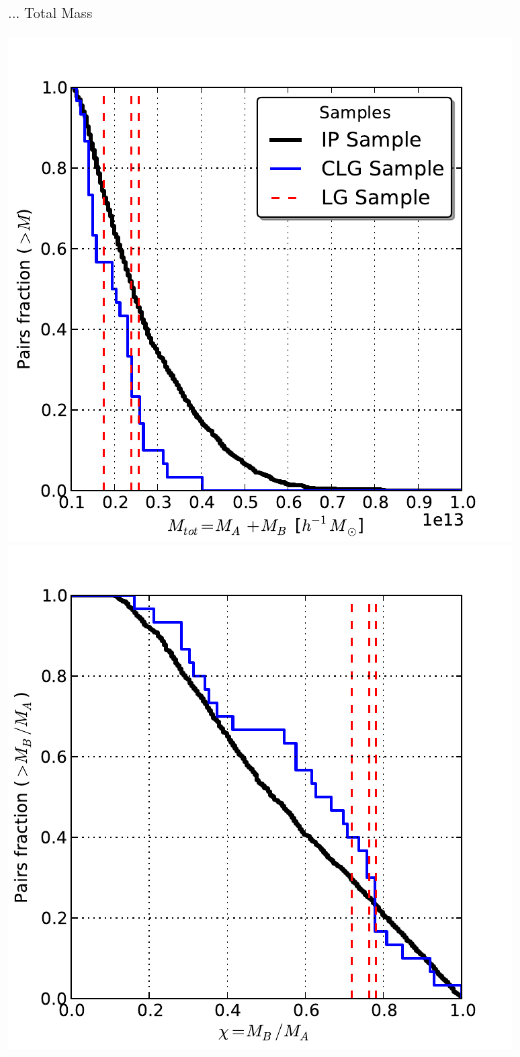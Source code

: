 \documentclass[usenatbib]{latex/mn2e}
\begin{document}
... Total Mass

\begin{flushleft}
\begin{center}

\includegraphics[keepaspectratio=true,width=0.3\textheight]
{./figures/IP_IMF.pdf}
\includegraphics[keepaspectratio=true,width=0.3\textheight]
{./figures/IP_Mass_Ratio.pdf}


\label{fig:Index_Pairs}
\vspace{0.1 cm}
\end{center}
\end{flushleft}
\end{document}
